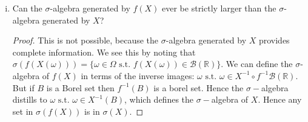 \documentclass{article}
\newcommand{\R}{\mathbb{R}}
\newcommand{\st}{\text{ s.t. }}
\newcommand{\seq}[1]{\{ #1 \}}
\theoremstyle{definition}
\theoremstyle{definition}
\begin{document}
\begin{enumerate}
\begin{enumerate}[(i)]
\begin{proof}
        \end{proof}
        \item Can the $\sigma$-algebra generated by $f(X)$ ever be strictly larger than the $\sigma$-algebra generated by $X$?
        
        \begin{proof}
        This is not possible, because the $\sigma$-algebra generated by $X$ provides complete information. We see this by noting that $\sigma(f(X(\omega))) = \seq{\omega \in \Omega \st f(X(\omega)) \in \mathcal{B}(\R)}$. We can define the $\sigma$-algebra of $f(X)$ in terms of the inverse images: $\omega \st \omega \in X^{-1}\circ f^{-1}\mathcal{B(\R)}$. But if $B$ is a Borel set then $f^{-1}(B)$ is a borel set. Hence the $\sigma-$algebra distills to $\omega \st \omega \in X^{-1}(B)$, which defines the $\sigma-$algebra of $X$. Hence any set in $\sigma(f(X))$ is in $\sigma(X)$. 
        \end{proof}
    \end{enumerate}
    

\end{enumerate}
\end{document}

